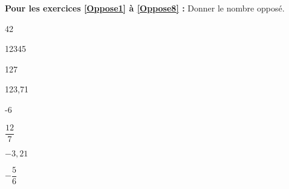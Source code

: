 \textbf{Pour les exercices \ref{Oppose1} à \ref{Oppose8} : } Donner le nombre opposé.

\begin{multicols}{4}
    42

    12345
    
    127

    123,71
\end{multicols}

\begin{multicols}{4}
    -6

    $\dfrac{12}{7}$
    
    $-3,21$

    $-\dfrac{5}{6}$
\end{multicols}